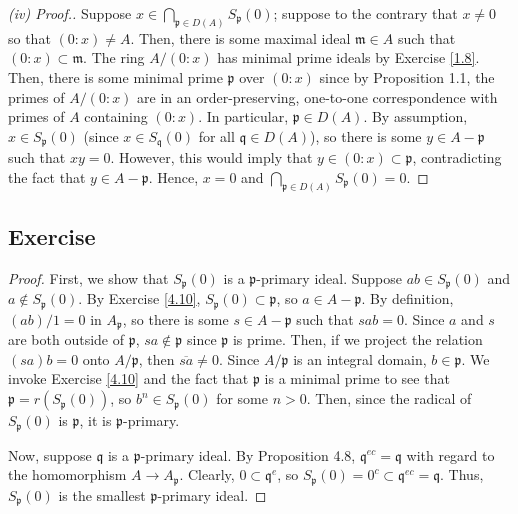 \begin{proof}[(iv) Proof.]
Suppose $x \in \bigcap_{\mathfrak{p} \in D(A)}S_{\mathfrak{p}}(0)$; suppose to the contrary that $x \neq 0$ so that $(0:x) \neq A$. Then, there is some maximal ideal $\mathfrak{m} \in A$ such
that $(0:x) \subset \mathfrak{m}$. The ring $A/(0:x)$ has minimal prime ideals by Exercise \ref{1.8}. Then, there is some minimal prime $\mathfrak{p}$ over $(0:x)$ since by 
Proposition 1.1, the primes of $A/(0:x)$ are in an order-preserving, one-to-one correspondence with primes of $A$ containing $(0:x)$. In particular, $\mathfrak{p} \in D(A)$. By assumption, 
$x \in S_\mathfrak{p}(0)$ (since $x \in S_\mathfrak{q}(0)$ for all $\mathfrak{q}\in D(A)$), so there is some $y \in A - \mathfrak{p}$ such that $xy = 0$. However, this would imply that 
$y \in (0:x) \subset \mathfrak{p}$, contradicting the fact that $y \in A - \mathfrak{p}$. Hence, $x = 0$ and $\bigcap_{\mathfrak{p} \in D(A)}S_{\mathfrak{p}}(0) = 0$.
\end{proof}

\subsection{Exercise}\label{4.11}

\begin{proof}
First, we show that $S_{\mathfrak{p}}(0)$ is a $\mathfrak{p}$-primary ideal. Suppose $ab \in S_{\mathfrak{p}}(0)$ and $a \not\in S_\mathfrak{p}(0)$. By Exercise \ref{4.10}, 
$S_{\mathfrak{p}}(0) \subset \mathfrak{p}$, so $a \in A - \mathfrak{p}$. By definition, $(ab)/1 = 0$ in $A_\mathfrak{p}$, so there is some $s \in A - \mathfrak{p}$ such that $sab = 0$.
Since $a$ and $s$ are both outside of $\mathfrak{p}$, $sa \not\in \mathfrak{p}$ since $\mathfrak{p}$ is prime. Then, if we project the relation $(sa)b = 0$ onto $A/\mathfrak{p}$, then
$\overline{sa} \neq 0$. Since $A/\mathfrak{p}$ is an integral domain, $b \in \mathfrak{p}$. We invoke Exercise \ref{4.10} and the fact that $\mathfrak{p}$ is a minimal prime to see that
$\mathfrak{p} = r(S_{\mathfrak{p}}(0))$, so $b^n \in S_{\mathfrak{p}}(0)$ for some $n > 0$. Then, since the radical of $S_\mathfrak{p}(0)$ is $\mathfrak{p}$, it is $\mathfrak{p}$-primary.

Now, suppose $\mathfrak{q}$ is a $\mathfrak{p}$-primary ideal. By Proposition 4.8, $\mathfrak{q}^{ec} = \mathfrak{q}$ with regard to the homomorphism $A \to A_{\mathfrak{p}}$. Clearly, 
$0 \subset \mathfrak{q}^e$, so $S_{\mathfrak{p}}(0) = 0^c \subset \mathfrak{q}^{ec} = \mathfrak{q}$. Thus, $S_{\mathfrak{p}}(0)$ is the smallest $\mathfrak{p}$-primary ideal.
\end{proof}

